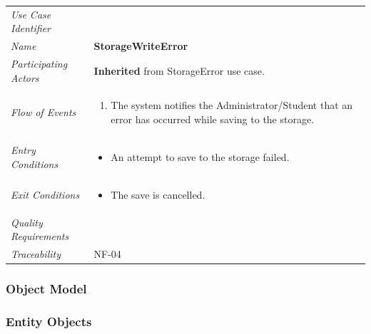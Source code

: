 \documentclass[12pt,letterpaper]{article}
\begin{document}
\begin{center}
	\begin{tabu} to 
		\toprule
		Use Case Identifier & \storagewriteerror{} \\
		Name & {\bf StorageWriteError} \\
		Participating Actors & \textbf{Inherited} from StorageError use case. \\
		Flow of Events & 
		\begin{minipage}[t]{\linewidth}
		    \begin{enumerate}
			    \item The system notifies the Administrator/Student that an error has occurred while saving to the storage.
			\end{enumerate}
		\end{minipage} \\

		Entry Conditions &
		\begin{minipage}[t]{\linewidth}
			\begin{itemize}
			    \item An attempt to save to the storage failed.
	        \end{itemize}
		\end{minipage} \\

		Exit Conditions &
		\begin{minipage}[t]{\linewidth}
			\begin{itemize}
			    \item The save is cancelled.
	        \end{itemize}
		\end{minipage} \\

		Quality Requirements & \\

		Traceability & NF-04 \\
		\toprule
	\end{tabu}
\end{center}

\subsubsection{Object Model}

\subsubsection*{Entity Objects}
\end{document}
